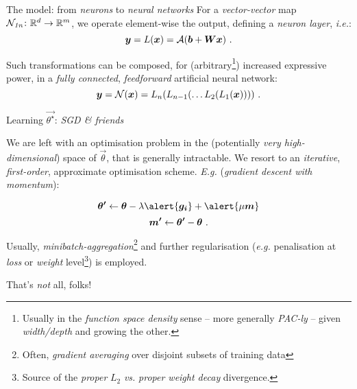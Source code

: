 {\begin{frame}{ The model: from \textit{neurons} to \textit{neural networks}}
        For a \textit{vector-vector} map $\mathcal{N}_{\textit{1n}}\colon \mathbb{R}^{d}\rightarrow\mathbb{R}^{m}$, we operate element-wise \wrt the output, defining a \textit{neuron layer}, \textit{i.e.}:
        $$ \bm{y} = L(\bm{x}) = \mathcal{A}(\bm{b} + \bm{W}\bm{x}) \text{ .} $$

        Such transformations can be composed, for (\alert{arbitrary}\footnote{Usually in the \textit{function space density} sense -- more generally \textit{PAC-ly} -- given \textit{width/depth} and growing the other.}) increased expressive power, in a \textit{fully connected}, \textit{feedforward} artificial neural network:
        $$ \bm{y} = \mathcal{N}(\bm{x}) = L_n(L_{n-1}(\dots L_2(L_1(\bm{x})))) \text{ .}$$

    \end{frame}
    \setcounter{footnote}{0}

    \begin{frame}{Learning $\vec{\theta^{\star}}$: \textit{SGD \& friends}}

        We are left with an \alert{optimisation} problem in the (potentially \textit{very high-dimensional}) space of $\vec{\theta}$, that is generally \alert{intractable}. We resort to an \textit{iterative}, \textit{first-order}, approximate optimisation scheme. \textit{E.g.} (\textit{gradient descent with momentum}):

        $$ \vec{\theta^{\prime}} \leftarrow \vec{\theta} - \lambda\alert{\vec{g_i}} + \alert{\mu\vec{m}}$$
        $$ \bm{m^{\prime}} \leftarrow \bm{\theta^{\prime}} - \bm{\theta}\text{ .}$$

        Usually, \textit{minibatch-aggregation}\footnote{Often, \textit{gradient averaging} over disjoint subsets of training data} and further \alert{regularisation} (\textit{e.g.} penalisation at \textit{loss} or \textit{weight} level\footnote{Source of the \textit{proper} $L_2$ \textit{vs.} \textit{proper weight decay} divergence.}) is employed.
    \end{frame}

    \begin{frame}{ That's \textit{not} all, folks!}


\end{frame}}
